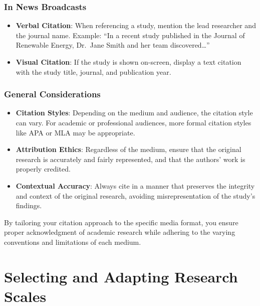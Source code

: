\documentclass[
]{book}
\begin{document}
\hypertarget{in-news-broadcasts}{%
\subsection*{In News Broadcasts}\label{in-news-broadcasts}}

\begin{itemize}
\item
  \textbf{Verbal Citation}: When referencing a study, mention the lead researcher and the journal name. Example: ``In a recent study published in the Journal of Renewable Energy, Dr.~Jane Smith and her team discovered\ldots{}''
\item
  \textbf{Visual Citation}: If the study is shown on-screen, display a text citation with the study title, journal, and publication year.
\end{itemize}

\hypertarget{general-considerations}{%
\subsection*{General Considerations}\label{general-considerations}}

\begin{itemize}
\item
  \textbf{Citation Styles}: Depending on the medium and audience, the citation style can vary. For academic or professional audiences, more formal citation styles like APA or MLA may be appropriate.
\item
  \textbf{Attribution Ethics}: Regardless of the medium, ensure that the original research is accurately and fairly represented, and that the authors' work is properly credited.
\item
  \textbf{Contextual Accuracy}: Always cite in a manner that preserves the integrity and context of the original research, avoiding misrepresentation of the study's findings.
\end{itemize}

By tailoring your citation approach to the specific media format, you ensure proper acknowledgment of academic research while adhering to the varying conventions and limitations of each medium.

\hypertarget{selecting-and-adapting-research-scales}{%
\chapter*{Selecting and Adapting Research Scales}\label{selecting-and-adapting-research-scales}}
\end{document}
